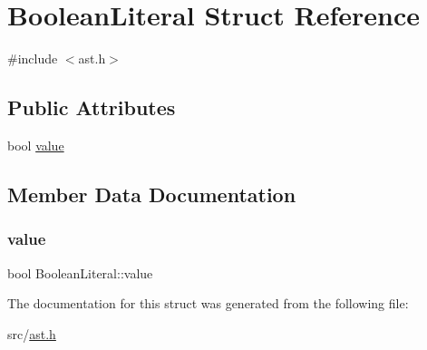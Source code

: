 \hypertarget{struct_boolean_literal}{}\section{Boolean\+Literal Struct Reference}
\label{struct_boolean_literal}


{\ttfamily \#include $<$ast.\+h$>$}

\subsection*{Public Attributes}
\begin{DoxyCompactItemize}
\item 
bool \hyperlink{struct_boolean_literal_a2d343f4fae4b805fc0260cc86c38d3cc}{value}
\end{DoxyCompactItemize}


\subsection{Member Data Documentation}
\mbox{\label{struct_boolean_literal_a2d343f4fae4b805fc0260cc86c38d3cc}} 
\subsubsection{\texorpdfstring{value}{value}}
{\footnotesize\ttfamily bool Boolean\+Literal\+::value}



The documentation for this struct was generated from the following file\+:\begin{DoxyCompactItemize}
\item 
src/\hyperlink{ast_8h}{ast.\+h}\end{DoxyCompactItemize}
